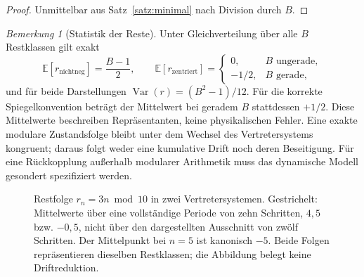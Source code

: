 \documentclass[11pt,a4paper]{scrartcl}
\theoremstyle{definition}
\theoremstyle{plain}
\theoremstyle{remark}
\newtheorem{bemerkung}[definition]{Bemerkung}
\newcommand{\E}{\mathbb{E}}
\newcommand{\Var}{\operatorname{Var}}
\begin{document}
\begin{proof}
Unmittelbar aus Satz~\ref{satz:minimal} nach Division durch $B$.
\end{proof}

\begin{bemerkung}[Statistik der Reste]
\label{bem:statistik}
Unter Gleichverteilung über alle $B$ Restklassen gilt exakt
\[
\E[r_{\mathrm{nichtneg}}]=\frac{B-1}{2},\qquad
\E[r_{\mathrm{zentriert}}]=
\begin{cases}0,&B\text{ ungerade},\\-1/2,&B\text{ gerade},\end{cases}
\]
und für beide Darstellungen $\Var(r)=(B^2-1)/12$. Für die korrekte Spiegelkonvention beträgt der Mittelwert bei geradem $B$ stattdessen $+1/2$. Diese Mittelwerte beschreiben Repräsentanten, keine physikalischen Fehler. Eine exakte modulare Zustandsfolge bleibt unter dem Wechsel des Vertretersystems kongruent; daraus folgt weder eine kumulative Drift noch deren Beseitigung. Für eine Rückkopplung außerhalb modularer Arithmetik muss das dynamische Modell gesondert spezifiziert werden.

\end{bemerkung}

\begin{figure}[htbp]
\centering
{}
\caption{Restfolge $r_n=3n\bmod10$ in zwei Vertretersystemen. Gestrichelt: Mittelwerte über eine vollständige Periode von zehn Schritten, $4{,}5$ bzw. $-0{,}5$, nicht über den dargestellten Ausschnitt von zwölf Schritten. Der Mittelpunkt bei $n=5$ ist kanonisch $-5$. Beide Folgen repräsentieren dieselben Restklassen; die Abbildung belegt keine Driftreduktion.}

\label{fig:drift}
\end{figure}
\end{document}
